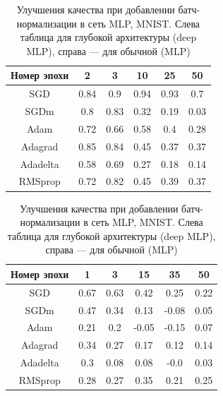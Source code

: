 \documentclass[12pt]{article}
\begin{document}
\begin{table}[h!]
\centering
\begin{minipage}{0.45\linewidth}
\begin{tabular}{|c|c|c|c|c|c|}\hline
\textbf{Номер эпохи} & \textbf{2} & \textbf{3} & \textbf{10} & \textbf{25} & \textbf{50} \\\hline

SGD & 0.84 & 0.9 & 0.94 & 0.93 & 0.7 \\\hline

SGDm & 0.8 & 0.83 & 0.32 & 0.19 & 0.03 \\\hline

Adam & 0.72 & 0.66 & 0.58 & 0.4 & 0.28 \\\hline

Adagrad & 0.85 & 0.84 & 0.45 & 0.37 & 0.37 \\\hline

Adadelta & 0.58 & 0.69 & 0.27 & 0.18 & 0.14 \\\hline

RMSprop & 0.72 & 0.82 & 0.45 & 0.39 & 0.37 \\\hline
\end{tabular}
\end{minipage} \hfill
\begin{minipage}{0.45\linewidth}
\begin{tabular}{|c|c|c|c|c|c|}\hline
\textbf{Номер эпохи} & \textbf{1} & \textbf{3} & \textbf{15} & \textbf{35} & \textbf{50} \\\hline
SGD & 0.67 & 0.63 & 0.42 & 0.25 & 0.22 \\\hline

{SGDm} & 0.47 & 0.34 &  {0.13} &  {-0.08} &  {0.05} \\\hline

{Adam} &  {0.21} &  {0.2} & {-0.05} & {-0.15} & {0.07} \\\hline

Adagrad & 0.34 & 0.27 & 0.17 & 0.12 & 0.14 \\\hline

{Adadelta} & {0.3} & {0.08} & {0.08} & {-0.0} & {0.03} \\\hline

RMSprop & {0.28} & {0.27} & 0.35 & 0.21 & 0.25 \\\hline

\end{tabular}
\end{minipage}
\caption{\small Улучшения качества при добавлении батч-нормализации в сеть MLP, MNIST. Слева таблица для глубокой архитектуры (deep MLP), справа --- для обычной (MLP)} \label{table:6.mlp}
\end{table}
\end{document}
